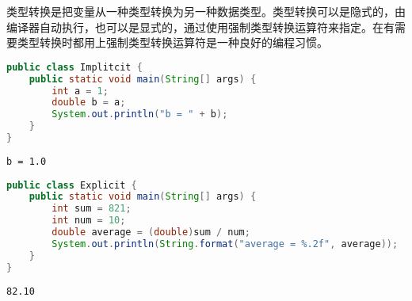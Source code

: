类型转换是把变量从一种类型转换为另一种数据类型。类型转换可以是隐式的，由编译器自动执行，也可以是显式的，通过使用强制类型转换运算符来指定。在有需要类型转换时都用上强制类型转换运算符是一种良好的编程习惯。\\


\begin{lstlisting}[language=Java]
public class Implitcit {
	public static void main(String[] args) {
		int a = 1;
		double b = a;
		System.out.println("b = " + b);
	}
}
\end{lstlisting}

\begin{tcolorbox}
	\begin{verbatim}
b = 1.0
	\end{verbatim}
\end{tcolorbox}

\vspace{0.5cm}


\begin{lstlisting}[language=Java]
public class Explicit {
	public static void main(String[] args) {
		int sum = 821;
		int num = 10;
		double average = (double)sum / num;
		System.out.println(String.format("average = %.2f", average));
	}
}
\end{lstlisting}

\begin{tcolorbox}
	\begin{verbatim}
82.10
	\end{verbatim}
\end{tcolorbox}

\newpage